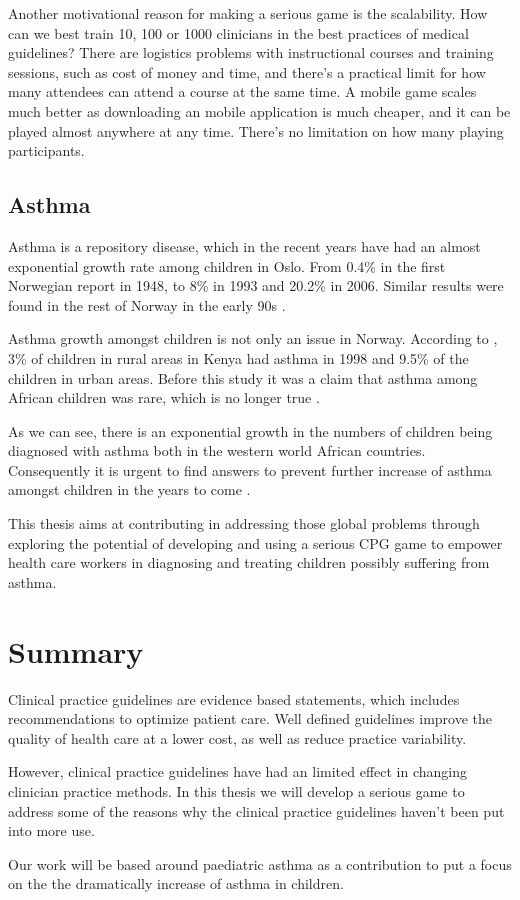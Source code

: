 Another motivational reason for making a serious game is the scalability. How can we best train 10, 100 or 1000 clinicians in the best practices of medical guidelines? There are logistics problems with instructional courses and training sessions, such as cost of money and time, and there's a practical limit for how many attendees can attend a course at the same time. A mobile game scales much better as downloading an mobile application is much cheaper, and it can be played almost anywhere at any time. There's no limitation on how many playing participants.

\subsection{Asthma}
Asthma is a repository disease, which in the recent years have had an almost exponential growth rate among children in Oslo. From 0.4\% in the first Norwegian report in 1948, to 8\% in 1993 and 20.2\% in 2006. Similar results were found in the rest of Norway in the early 90s \parencite{Carlsen2006}. 

Asthma growth amongst children is not only an issue in Norway. According to \textcite{Odhiambo1998}, 3\% of children in rural areas in Kenya had asthma in 1998 and 9.5\% of the children in urban areas. Before this study it was a claim that asthma among African children was rare, which is no longer true \parencite{Odhiambo1998}.

As we can see, there is an exponential growth in the numbers of children being diagnosed with asthma both in the western world African countries. Consequently it is urgent to find answers to prevent further increase of asthma amongst children in the years to come \parencite{Carlsen2006}.

This thesis aims at contributing in addressing those global problems through exploring the potential of developing and using a serious CPG game to empower health care workers in diagnosing and treating children possibly suffering from asthma.


\section{Summary}
Clinical practice guidelines are evidence based statements, which includes recommendations to optimize patient care. Well defined guidelines improve the quality of health care at a lower cost, as well as reduce practice variability.

However, clinical practice guidelines have had an limited effect in changing clinician practice methods. In this thesis we will develop a serious game to address some of the reasons why the clinical practice guidelines haven't been put into more use.

Our work will be based around paediatric asthma as a contribution to put a focus on the the dramatically increase of asthma in children.
